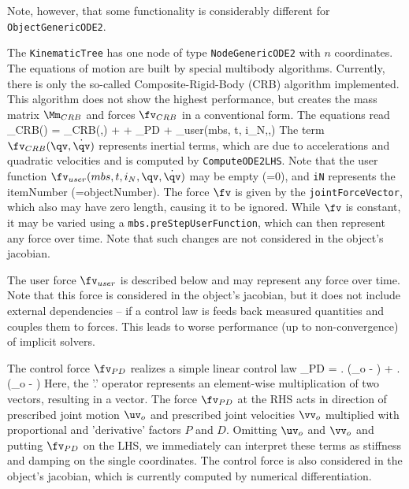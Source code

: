     Note, however, that some functionality is considerably different for \texttt{ObjectGenericODE2}.
    
    The \texttt{KinematicTree} has one node of type \texttt{NodeGenericODE2} with $n$ coordinates.
    The equations of motion are built by special multibody algorithms. Currently, there is only the
    so-called Composite-Rigid-Body (CRB) algorithm implemented.
    This algorithm does not show the highest performance, but creates the mass matrix $\Mm_{CRB}$ and forces $\fv_{CRB}$
    in a conventional form. The equations read
    \be \label{eq_KinematicTree_EOM}
      \Mm_{CRB}(\qv) \ddot \qv = \fv_{CRB}(\qv,\dot \qv) + \fv + \fv_{PD} + \fv_{user}(mbs, t, i_N,\qv,\dot \qv)
    \ee
    The term $\fv_{CRB}(\qv,\dot \qv)$ represents inertial terms, which are due to accelerations and 
    quadratic velocities and is computed by \texttt{ComputeODE2LHS}.
    Note that the user function $\fv_{user}(mbs, t, i_N,\qv,\dot \qv)$ may be empty (=0), 
    and \texttt{iN} represents the itemNumber (=objectNumber). 
    The force $\fv$ is given by the \texttt{jointForceVector}, which also may have zero length, causing it to be ignored.
    While $\fv$ is constant, it may be varied using a \texttt{mbs.preStepUserFunction}, which can
    then represent any force over time. Note that such changes are not considered in the object's jacobian.
    
    The user force $\fv_{user}$ is described below and may represent any force over time.
    Note that this force is considered in the object's jacobian, but it does not include external 
    dependencies -- if a control law is feeds back measured quantities and couples them to forces.
    This leads to worse performance (up to non-convergence) of implicit solvers.
    
    The control force $\fv_{PD}$ realizes a simple linear control law
    \be
      \fv_{PD} = \Pm . (\uv_o - \qv) + \Dm . (\vv_o - \dot \qv)
    \ee
    Here, the '.' operator represents an element-wise multiplication of two vectors, resulting in a vector.
    The force $\fv_{PD}$ at the \ac{RHS} acts in direction of prescribed joint motion $\uv_o$ and
    prescribed joint velocities $\vv_o$ multiplied with proportional and 'derivative' factors $P$ and $D$.
    Omitting $\uv_o$ and $\vv_o$ and putting $\fv_{PD}$ on the \ac{LHS}, we immediately can interpret these
    terms as stiffness and damping on the single coordinates.
    The control force is also considered in the object's jacobian, which is currently computed by numerical
    differentiation.
        
